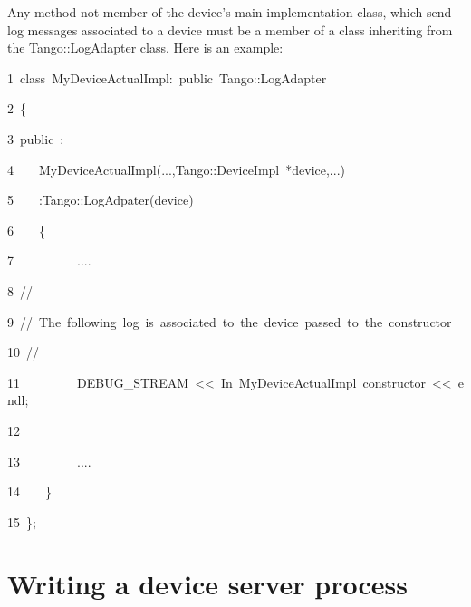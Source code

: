 Any method not member of the device's main implementation class, which
send log messages associated to a device must be a member of a class
inheriting from the Tango::LogAdapter class. Here is an example:


\begin{lyxcode}
1~class~MyDeviceActualImpl:~public~Tango::LogAdapter

2~\{

3~public~:

4~~~~MyDeviceActualImpl(...,Tango::DeviceImpl~{*}device,...)

5~~~~:Tango::LogAdpater(device)

6~~~~\{

7~~~~~~~~~~....

8~//

9~//~The~following~log~is~associated~to~the~device~passed~to~the~constructor

10~//

11~~~~~~~~~DEBUG\_STREAM~<\textcompwordmark{}<~\textquotedbl{}In~MyDeviceActualImpl~constructor\textquotedbl{}~<\textcompwordmark{}<~endl;

12~

13~~~~~~~~~....

14~~~~\}

15~\};
\end{lyxcode}



\section{Writing a device server process\label{Writing_chapter}}

